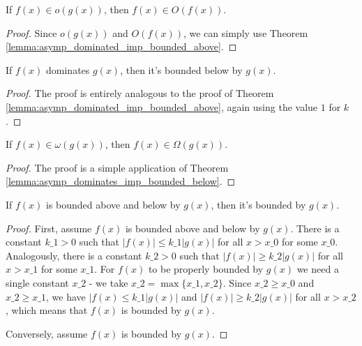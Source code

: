 \begin{lemma}
    \label{lemma:small_o_imp_big_o}
    \leanok
    If $f(x) \in o(g(x))$, then $f(x) \in O(f(x))$.
\end{lemma}

\begin{proof}
    \leanok
    Since $o(g(x))$ and $O(f(x))$, we can simply use Theorem 
    \ref{lemma:asymp_dominated_imp_bounded_above}.
\end{proof}

\begin{lemma}
    \label{lemma:asymp_dominates_imp_bounded_below}
    \leanok
    If $f(x)$ dominates $g(x)$, then it's bounded below by $g(x)$.
\end{lemma}

\begin{proof}
    \leanok
    The proof is entirely analogous to the proof of Theorem 
    \ref{lemma:asymp_dominated_imp_bounded_above}, again using the value 
    $1$ for $k$.
\end{proof}

\begin{theorem}
    \label{thm:small_omega_imp_big_omega}
    \leanok
    If $f(x) \in \omega(g(x))$, then $f(x) \in \Omega(g(x))$.
\end{theorem}

\begin{proof}
    \leanok
    The proof is a simple application of Theorem 
    \ref{lemma:asymp_dominates_imp_bounded_below}.
\end{proof}

\begin{theorem}
    \label{thm:asymp_bounded_above_and_below_equiv_bounded}
    \leanok
    If $f(x)$ is bounded above and below by $g(x)$, then it's bounded by $g(x)$.
\end{theorem}

\begin{proof}
    \leanok
    First, assume $f(x)$ is bounded above and below by $g(x)$. There is a constant
    $k\_1 > 0$ such that $|f(x)| \le k\_1 |g(x)|$ for all $x > x\_0$ for some $x\_0$.
    Analogously, there is a constant $k\_2 > 0$ such that $|f(x)| \ge k\_2 |g(x)|$ 
    for all $x > x\_1$ for some $x\_1$. For $f(x)$ to be properly bounded by $g(x)$ 
    we need a single constant $x\_2$ - we take $x\_2 = \max{\{x\_1, x\_2\}}$. Since 
    $x\_2 \ge x\_0$ and $x\_2 \ge x\_1$, we have $|f(x) \le k\_1 |g(x)|$ and 
    $|f(x)| \ge k\_2 |g(x)|$ for all $x > x\_2$, which means that $f(x)$ is bounded
    by $g(x)$.

    Conversely, assume $f(x)$ is bounded by $g(x)$.
\end{proof}

